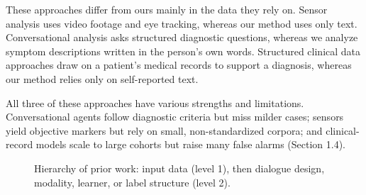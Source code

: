 \documentclass[sigconf]{acmart}
\begin{document}
These approaches differ from ours mainly in the data they rely on. Sensor analysis uses video footage and eye tracking, whereas our method uses only text. Conversational analysis asks structured diagnostic questions, whereas we analyze symptom descriptions written in the person's own words. Structured clinical data approaches draw on a patient's medical records to support a diagnosis, whereas our method relies only on self-reported text.

All three of these approaches have various strengths and limitations. Conversational agents follow diagnostic criteria but miss milder cases; sensors yield objective markers but rely on small, non-standardized corpora; and clinical-record models scale to large cohorts but raise many false alarms (Section 1.4).

\begin{figure}[t]
\centering
{}
\caption{Hierarchy of prior work: input data (level 1), then dialogue design, modality, learner, or label structure (level 2).}
\label{fig:hierarchy}
\end{figure}
\end{document}
